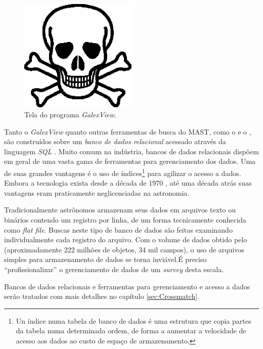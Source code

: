 \begin{figure}
	\includegraphics[width=0.5\textwidth]{figuras/test.eps}
	\caption[Tela do programa{\em GalexView}.]
	{Tela do programa {\em GalexView}.}
	\label{fig:GalexView}
\end{figure}

Tanto o {\em GalexView} quanto outras ferramentas de busca do MAST, como o
 e o , são construídos sobre um
{\em banco de dados relacional} acessado através da linguagem {\em SQL}
\citep{Chamberlin1974}. Muito comum na indústria, bancos de dados relacionais
dispõem em geral de uma vasta gama de ferramentas para gerenciamento dos dados.
Uma de suas grandes vantagens é o uso de índices\footnote{Un índice numa tabela
de banco de dados é uma estrutura que copia partes da tabela numa determinada
ordem, de forma a aumentar a velocidade de acesso aos dados ao custo de espaço
de armazenamento.} para agilizar o acesso a dados. Embora a tecnologia exista
desde a década de 1970 \citep{Codd1970}, até uma década atrás suas vantagens
eram praticamente neglicenciadas na astronomia.

Tradicionalmente astrônomos armazenam seus dados em arquivos texto ou binários
contendo um registro por linha, de um forma tecnicamente conhecida como {\em
flat file}. Buscas neste tipo de banco de dados são feitas examinando
individualmente cada registro do arquivo. Com o volume de dados obtido pelo
\galex (aproximadamente 222 milhões de objetos, 34 mil campos)\citneed, o uso
de arquivos simples para armazenamento de dados se torna inviável.\citneed É
preciso ``profissionalizar'' o gerenciamento de dados de um {\em survey} desta
escala.

Bancos de dados relacionais e ferramentas para gerenciamento e acesso a dados
serão tratados com mais detalhes no capítulo \ref{sec:Crossmatch}.



